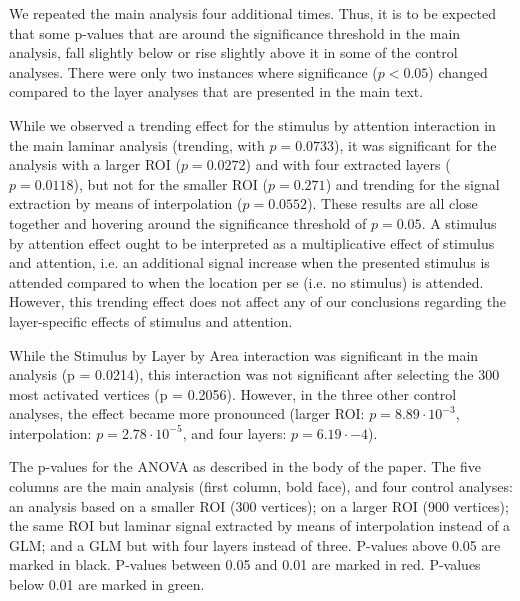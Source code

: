 \documentclass[9pt,lineno]{aperture}
\begin{document}
\begin{appendixbox}
We repeated the main analysis four additional times. Thus, it is to be expected that some p-values that are around the significance threshold in the main analysis, fall slightly below or rise slightly above it in some of the control analyses. There were only two instances where significance ($p < 0.05$) changed compared to the layer analyses that are presented in the main text. 

While we observed a trending effect for the stimulus by attention interaction in the main laminar analysis (trending, with $p=0.0733$), it was significant for the analysis with a larger ROI ($p=0.0272$) and with four extracted layers ($p=0.0118$), but not for the smaller ROI ($p=0.271$) and trending for the signal extraction by means of interpolation ($p=0.0552$). These results are all close together and hovering around the significance threshold of $p=0.05$. A stimulus by attention effect ought to be interpreted as a multiplicative effect of stimulus and attention, i.e. an additional signal increase when the presented stimulus is attended compared to when the location per se (i.e. no stimulus) is attended. However, this trending effect does not affect any of our conclusions regarding the layer-specific effects of stimulus and attention. 

While the Stimulus by Layer by Area interaction was significant in the main analysis (p = 0.0214), this interaction was not significant after selecting the 300 most activated vertices (p = 0.2056). However, in the three other control analyses, the effect became more pronounced (larger ROI: $p=8.89\cdot10^{-3}$, interpolation: $p=2.78\cdot10^{-5}$, and four layers: $p=6.19\cdot{-4}$). 
\end{appendixbox}

\begin{table}
\caption{The p-values for the ANOVA as described in the body of the paper. The five columns are the main analysis (first column, bold face), and four control analyses: an analysis based on a smaller ROI (300 vertices); on a larger ROI (900 vertices); the same ROI but laminar signal extracted by means of interpolation instead of a GLM; and a GLM but with four layers instead of three. P-values above 0.05 are marked in black. P-values between 0.05 and 0.01 are marked in red. P-values below 0.01 are marked in green.}
\label{TABLE:control-analyses}

\end{table}
\end{document}
